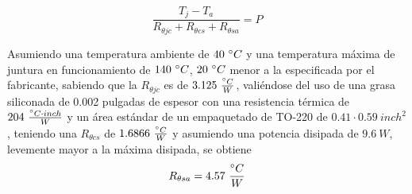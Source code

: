 \begin{equation}
\frac{T_j - T_a}{R_{\theta jc}+R_{\theta cs}+R_{\theta sa}} = P
\end{equation}

Asumiendo una temperatura ambiente de $40 \ \degree C$ y una temperatura máxima de juntura en funcionamiento de $140 \ \degree C$, $20 \ \degree C$ menor a la especificada por el fabricante, sabiendo que la $R_{\theta jc}$ es de $3.125 \ \frac{\degree C}{W}$, valiéndose del uso de una grasa siliconada de 0.002 pulgadas de espesor con una resistencia térmica de $204 \ \frac{\degree C \cdot inch}{W}$ y un área estándar de un empaquetado de TO-220 de $0.41\cdot 0.59 \ inch^2$, teniendo una $R_{\theta cs}$ de $1.6866 \ \frac{\degree C}{W}$ y asumiendo  una potencia disipada de $9.6 \ W$, levemente mayor a la máxima disipada, se obtiene
\begin{equation}
R_{\theta sa} = 4.57 \ \frac{\degree C}{W}
\end{equation}

